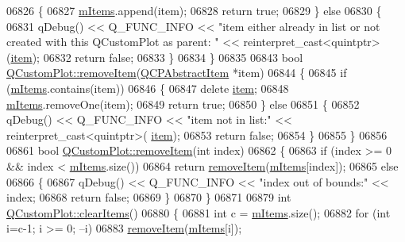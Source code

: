 \begin{DoxyCode}
06826   \{
06827     \hyperlink{a00116_a6fcfff6ea3ccabcac8818943adb79a72}{mItems}.append(item);
06828     \textcolor{keywordflow}{return} \textcolor{keyword}{true};
06829   \} \textcolor{keywordflow}{else}
06830   \{
06831     qDebug() << Q\_FUNC\_INFO << \textcolor{stringliteral}{"item either already in list or not created with this QCustomPlot as parent:
      "} << \textcolor{keyword}{reinterpret\_cast<}quintptr\textcolor{keyword}{>}(\hyperlink{a00116_aac743a709d025448e36cb65c9117d64b}{item});
06832     \textcolor{keywordflow}{return} \textcolor{keyword}{false};
06833   \}
06834 \}
06835 
06843 \textcolor{keywordtype}{bool} \hyperlink{a00116_ae68a4ab305034c0fe733a95704e4db5e}{QCustomPlot::removeItem}(\hyperlink{a00022}{QCPAbstractItem} *item)
06844 \{
06845   \textcolor{keywordflow}{if} (\hyperlink{a00116_a6fcfff6ea3ccabcac8818943adb79a72}{mItems}.contains(item))
06846   \{
06847     \textcolor{keyword}{delete} \hyperlink{a00116_aac743a709d025448e36cb65c9117d64b}{item};
06848     \hyperlink{a00116_a6fcfff6ea3ccabcac8818943adb79a72}{mItems}.removeOne(item);
06849     \textcolor{keywordflow}{return} \textcolor{keyword}{true};
06850   \} \textcolor{keywordflow}{else}
06851   \{
06852     qDebug() << Q\_FUNC\_INFO << \textcolor{stringliteral}{"item not in list:"} << \textcolor{keyword}{reinterpret\_cast<}quintptr\textcolor{keyword}{>}(
      \hyperlink{a00116_aac743a709d025448e36cb65c9117d64b}{item});
06853     \textcolor{keywordflow}{return} \textcolor{keyword}{false};
06854   \}
06855 \}
06856 
06861 \textcolor{keywordtype}{bool} \hyperlink{a00116_ae68a4ab305034c0fe733a95704e4db5e}{QCustomPlot::removeItem}(\textcolor{keywordtype}{int} index)
06862 \{
06863   \textcolor{keywordflow}{if} (index >= 0 && index < \hyperlink{a00116_a6fcfff6ea3ccabcac8818943adb79a72}{mItems}.size())
06864     \textcolor{keywordflow}{return} \hyperlink{a00116_ae68a4ab305034c0fe733a95704e4db5e}{removeItem}(\hyperlink{a00116_a6fcfff6ea3ccabcac8818943adb79a72}{mItems}[index]);
06865   \textcolor{keywordflow}{else}
06866   \{
06867     qDebug() << Q\_FUNC\_INFO << \textcolor{stringliteral}{"index out of bounds:"} << index;
06868     \textcolor{keywordflow}{return} \textcolor{keyword}{false};
06869   \}
06870 \}
06871 
06879 \textcolor{keywordtype}{int} \hyperlink{a00116_a9d204691a56aadcba8365a49637fa145}{QCustomPlot::clearItems}()
06880 \{
06881   \textcolor{keywordtype}{int} c = \hyperlink{a00116_a6fcfff6ea3ccabcac8818943adb79a72}{mItems}.size();
06882   \textcolor{keywordflow}{for} (\textcolor{keywordtype}{int} i=c-1; i >= 0; --i)
06883     \hyperlink{a00116_ae68a4ab305034c0fe733a95704e4db5e}{removeItem}(\hyperlink{a00116_a6fcfff6ea3ccabcac8818943adb79a72}{mItems}[i]);

\end{DoxyCode}
